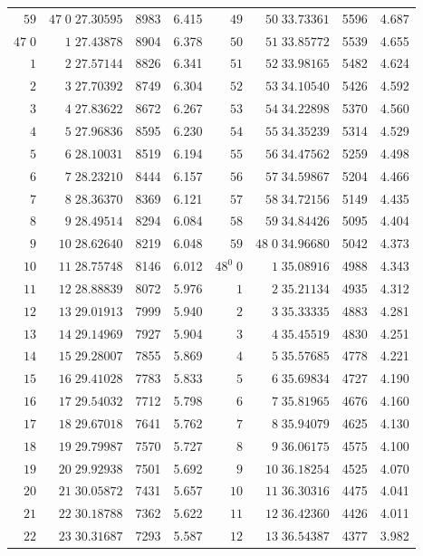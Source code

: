 \begin{center}
\begin{tabular}{|r|r|r|r||r|r|r|r|}
\(59\)&\(47\;0\;27.30595\)&8983&6.415&\(49\)&\(50\;33.73361\)&5596&4.687\\[3pt]
\(47\;0\)&\(1\;27.43878\)&8904&6.378&\(50\)&\(51\;33.85772\)&5539&4.655\\
\(1\)&\(2\;27.57144\)&8826&6.341&\(51\)&\(52\;33.98165\)&5482&4.624\\
\(2\)&\(3\;27.70392\)&8749&6.304&\(52\)&\(53\;34.10540\)&5426&4.592\\
\(3\)&\(4\;27.83622\)&8672&6.267&\(53\)&\(54\;34.22898\)&5370&4.560\\
\(4\)&\(5\;27.96836\)&8595&6.230&\(54\)&\(55\;34.35239\)&5314&4.529\\
\(5\)&\(6\;28.10031\)&8519&6.194&\(55\)&\(56\;34.47562\)&5259&4.498\\
\(6\)&\(7\;28.23210\)&8444&6.157&\(56\)&\(57\;34.59867\)&5204&4.466\\
\(7\)&\(8\;28.36370\)&8369&6.121&\(57\)&\(58\;34.72156\)&5149&4.435\\
\(8\)&\(9\;28.49514\)&8294&6.084&\(58\)&\(59\;34.84426\)&5095&4.404\\
\(9\)&\(10\;28.62640\)&8219&6.048&\(59\)&\(48\;0\;34.96680\)&5042&4.373\\[3pt]
\(10\)&\(11\;28.75748\)&8146&6.012&\(48^0\;0\)&\(1\;35.08916\)&4988&4.343\\
\(11\)&\(12\;28.88839\)&8072&5.976&\(1\)&\(2\;35.21134\)&4935&4.312\\
\(12\)&\(13\;29.01913\)&7999&5.940&\(2\)&\(3\;35.33335\)&4883&4.281\\
\(13\)&\(14\;29.14969\)&7927&5.904&\(3\)&\(4\;35.45519\)&4830&4.251\\
\(14\)&\(15\;29.28007\)&7855&5.869&\(4\)&\(5\;35.57685\)&4778&4.221\\
\(15\)&\(16\;29.41028\)&7783&5.833&\(5\)&\(6\;35.69834\)&4727&4.190\\
\(16\)&\(17\;29.54032\)&7712&5.798&\(6\)&\(7\;35.81965\)&4676&4.160\\
\(17\)&\(18\;29.67018\)&7641&5.762&\(7\)&\(8\;35.94079\)&4625&4.130\\
\(18\)&\(19\;29.79987\)&7570&5.727&\(8\)&\(9\;36.06175\)&4575&4.100\\
\(19\)&\(20\;29.92938\)&7501&5.692&\(9\)&\(10\;36.18254\)&4525&4.070\\[3pt]
\(20\)&\(21\;30.05872\)&7431&5.657&\(10\)&\(11\;36.30316\)&4475&4.041\\
\(21\)&\(22\;30.18788\)&7362&5.622&\(11\)&\(12\;36.42360\)&4426&4.011\\
\(22\)&\(23\;30.31687\)&7293&5.587&\(12\)&\(13\;36.54387\)&4377&3.982\\

\end{tabular}
\end{center}
